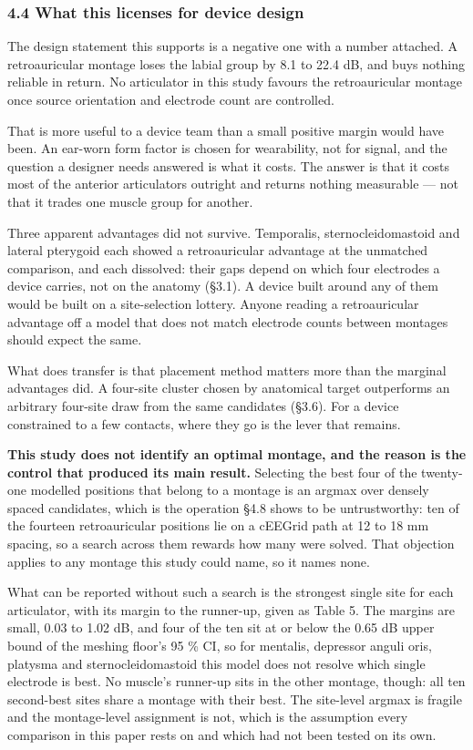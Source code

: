 \documentclass[
  11pt,
  letterpaper,
]{article}
\newcounter{none} %
\begin{document}
\subsubsection{4.4 What this licenses for device design}\label{what-this-licenses-for-device-design}

The design statement this supports is a negative one with a number attached. A
retroauricular montage loses the labial group by 8.1 to 22.4 dB, and buys
nothing reliable in return. No articulator in this study favours the
retroauricular montage once source orientation and electrode count are
controlled.

That is more useful to a device team than a small positive margin would have
been. An ear-worn form factor is chosen for wearability, not for signal, and the
question a designer needs answered is what it costs. The answer is that it costs
most of the anterior articulators outright and returns nothing measurable --- not
that it trades one muscle group for another.

Three apparent advantages did not survive. Temporalis, sternocleidomastoid and
lateral pterygoid each showed a retroauricular advantage at the unmatched
comparison, and each dissolved: their gaps depend on which four electrodes a
device carries, not on the anatomy (\S{}3.1). A device built around any of them
would be built on a site-selection lottery. Anyone reading a retroauricular
advantage off a model that does not match electrode counts between montages
should expect the same.

What does transfer is that placement method matters more than the marginal
advantages did. A four-site cluster chosen by anatomical target outperforms an
arbitrary four-site draw from the same candidates (\S{}3.6). For a device
constrained to a few contacts, where they go is the lever that remains.

\textbf{This study does not identify an optimal montage, and the reason is the control
that produced its main result.} Selecting the best four of the twenty-one modelled positions that belong to a montage is an argmax over densely spaced candidates, which is the
operation \S{}4.8 shows to be untrustworthy: ten of the fourteen retroauricular
positions lie on a cEEGrid path at 12 to 18 mm spacing, so a search across them
rewards how many were solved. That objection applies to any montage this study
could name, so it names none.

What can be reported without such a search is the strongest single site for each
articulator, with its margin to the runner-up, given as Table 5. The margins are
small, 0.03 to 1.02 dB, and four of the ten sit at or below the 0.65 dB upper
bound of the meshing floor's 95 \% CI, so for mentalis, depressor anguli oris,
platysma and sternocleidomastoid this model does not resolve which single
electrode is best. No muscle's runner-up sits in the other montage, though: all
ten second-best sites share a montage with their best. The site-level argmax is
fragile and the montage-level assignment is not, which is the assumption every
comparison in this paper rests on and which had not been tested on its own.
\end{document}
